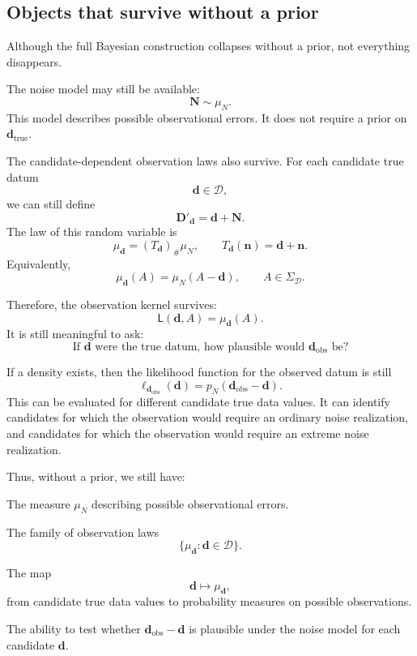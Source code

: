\documentclass[11pt]{article}
\newcommand{\Dspace}{\mathcal D}
\newcommand{\SigmaD}{\Sigma_{\mathcal D}}
\newcommand{\muN}{\mu_N}
\newcommand{\Dobsrand}{\mathbf D'}
\newcommand{\Nrand}{\mathbf N}
\newcommand{\dtrue}{\mathbf d_{\mathrm{true}}}
\newcommand{\dobs}{\mathbf d_{\mathrm{obs}}}
\begin{document}
\subsection{Objects that survive without a prior}

Although the full Bayesian construction collapses without a prior, not everything disappears.

The noise model may still be available:
\[
    \Nrand\sim\muN.
\]
This model describes possible observational errors. It does not require a prior on \(\dtrue\).

The candidate-dependent observation laws also survive. For each candidate true datum
\[
    \mathbf d\in\Dspace,
\]
we can still define
\[
    \Dobsrand_{\mathbf d}
    =
    \mathbf d+\Nrand.
\]
The law of this random variable is
\[
    \mu_{\mathbf d}
    =
    (T_{\mathbf d})_{\#}\muN,
    \qquad
    T_{\mathbf d}(\mathbf n)=\mathbf d+\mathbf n.
\]
Equivalently,
\[
    \mu_{\mathbf d}(A)
    =
    \muN(A-\mathbf d),
    \qquad
    A\in\SigmaD.
\]

Therefore, the observation kernel survives:
\[
    \mathsf L(\mathbf d,A)
    =
    \mu_{\mathbf d}(A).
\]
It is still meaningful to ask:
\[
    \text{If } \mathbf d \text{ were the true datum, how plausible would } \dobs \text{ be?}
\]

If a density exists, then the likelihood function for the observed datum is still
\[
    \ell_{\dobs}(\mathbf d)
    =
    p_N(\dobs-\mathbf d).
\]
This can be evaluated for different candidate true data values. It can identify candidates for which the observation would require an ordinary noise realization, and candidates for which the observation would require an extreme noise realization.

Thus, without a prior, we still have:
\begin{description}[leftmargin=3.2cm,style=nextline]
    \item[Noise model.]
    The measure \(\muN\) describing possible observational errors.

    \item[Sampling family.]
    The family of observation laws
    \[
        \{\mu_{\mathbf d}:\mathbf d\in\Dspace\}.
    \]

    \item[Observation kernel.]
    The map
    \[
        \mathbf d
        \longmapsto
        \mu_{\mathbf d},
    \]
    from candidate true data values to probability measures on possible observations.

    \item[Compatibility assessment.]
    The ability to test whether \(\dobs-\mathbf d\) is plausible under the noise model for each candidate \(\mathbf d\).
\end{description}
\end{document}
